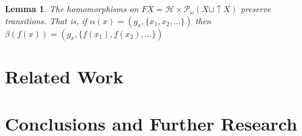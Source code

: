 \documentclass[12pt]{article}
\newtheorem{lemma}{Lemma}[section]
\theoremstyle{definition}
\newcommand{\1}{\mathbbm{1}}
\renewcommand{\H}{\mathcal{H}}
\newcommand{\finP}{\mathcal{P}_{\omega}}
\begin{document}
\begin{lemma}
    The homomorphisms on $FX = \H \times \finP(X \sqcup \uparrow X)$ preserve transitions. That is, if $\alpha (x) = (g_x, \{x_1, x_2, \dots\})$ then $\beta(f(x)) = (g_x, \{f(x_1), f(x_2), \dots\})$
\end{lemma}

\newpage
\section{Related Work}\label{relatedwork}

\section{Conclusions and Further Research}\label{conclusions}





\end{document}
